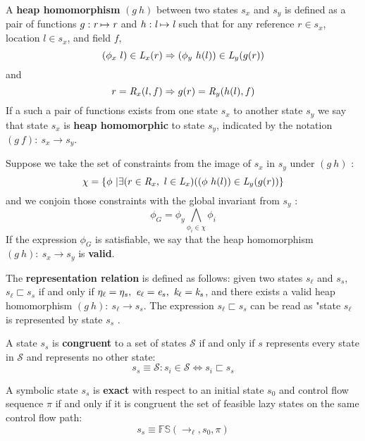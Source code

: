 \begin{definition}
A \textbf{heap homomorphism} $(g\ h)$ between two states $s_x$ and $s_y$ is defined as a pair of functions $g:\emph{r} \mapsto \emph{r}$ and $h:\emph{l} \mapsto \emph{l}$ such that for any reference $r \in s_x$, location $l \in s_x$, and field $f$, $$ (\phi_x\ l) \in \emph{L}_x(r) \Rightarrow (\phi_y\ h(l))\in \emph{L}_y(g(r))$$ and $$ r = \emph{R}_x(l,f) \Rightarrow g(r) = \emph{R}_y(h(l),f)$$ If a such a pair of functions exists from one state $s_x$ to another state $s_y$ we say that state $s_x$ is \textbf{heap homomorphic} to state $s_y$, indicated by the notation $(g\ f):\ s_x \rightarrow s_y$. 

Suppose we take the set of constraints from the image of $s_x$ in $s_y$ under $(g\ h)$ :
$$\chi = \{ \phi\ | \exists (r \in \emph{R}_x,\  l \in \emph{L}_x) ( (\phi\ h(l)) \in \emph{L}_y (g(r))  \}$$ and we conjoin those constraints with the global invariant from $s_y$ :
$$\phi_G = \phi_y \bigwedge_{\phi_i \in \chi} \phi_i $$
 If the expression $\phi_G$ is satisfiable, we say that the heap homomorphism $(g\ h):\ s_x \rightarrow s_y $ is \textbf{valid}.
\end{definition}
\begin{definition}
\label{representation}
The \textbf{representation relation} is defined as follows: given two states $s_\ell$ and $s_s$, $s_\ell \sqsubset s_s $ if and only if $\eta_{\ell} = \eta_{s} ,\ \cfgnt{e}_{\ell} = \cfgnt{e}_{s} ,\ \cfgnt{k}_{\ell} = \cfgnt{k}_{s}$, and there exists a valid heap homomorphism $(g\ h):\ s_\ell \rightarrow s_s $. The expression $s_\ell \sqsubset s_s $ can be read as "state $s_\ell$ is represented by state $s_s$ . 
\end{definition}

\begin{definition}
\label{congruent}
A state $s_s$ is \textbf{congruent} to a set of states $\mathcal{S}$ if and only if $s$ represents every state in $\mathcal{S}$ and represents no other state: 
$$ s_s \equiv \mathcal{S} : s_i \in \mathcal{S} \Leftrightarrow s_i \sqsubset s_s $$
\end{definition}

\begin{definition}
\label{exact}
A symbolic state $s_s$ is \textbf{exact} with respect to an initial state $s_0$ and control flow sequence $\pi$ if and only if it is congruent the set of feasible lazy states on the same control flow path:
$$ s_s \equiv \mathbb{FS}(\rightarrow_{\ell},s_0,\pi)$$
\end{definition}

